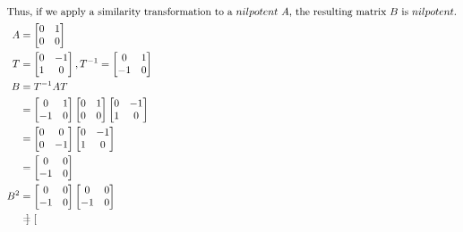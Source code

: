 \documentclass[letter, 11pt]{article}
\begin{document}
\begin{enumerate}[wide = 0pt, label = \textbf{Problem \arabic*:}]
\begin{subquestion}
\begin{align*}
				\shortintertext{Thus, if we apply a similarity transformation to a $ nilpotent $ $ A $, the resulting matrix $ B $ is $ nilpotent $.}
				A &= 
				\begin{bmatrix}
				0 & 1 \\
				0 & 0
				\end{bmatrix}
				\\
				T &= 
				\begin{bmatrix}
				0 & -1 \\
				1 & 0
				\end{bmatrix},
				T^{-1} =
				\begin{bmatrix}
				0 & 1 \\
				-1 & 0
				\end{bmatrix}
				\\
				B &= T^{-1}AT \\
				&= 
				\begin{bmatrix}
				0 & 1 \\
				-1 & 0
				\end{bmatrix}
				\begin{bmatrix}
				0 & 1 \\
				0 & 0
				\end{bmatrix}
				\begin{bmatrix}
				0 & -1 \\
				1 & 0
				\end{bmatrix}
				\\
				&= 
				\begin{bmatrix}
				0 & 0 \\
				0 & -1
				\end{bmatrix}
				\begin{bmatrix}
				0 & -1 \\
				1 & 0
				\end{bmatrix}
				\\
				&=
				\begin{bmatrix}
				0 & 0 \\
				-1 & 0
				\end{bmatrix}
				\\
				B^2 &= 
				\begin{bmatrix}
				0 & 0 \\
				-1 & 0
				\end{bmatrix}
				\begin{bmatrix}
				0 & 0 \\
				-1 & 0
				\end{bmatrix}
				\\
				&=
				\begin{bmatrix}

\end{bmatrix}
\end{align*}
\end{subquestion}
\end{enumerate}
\end{document}
